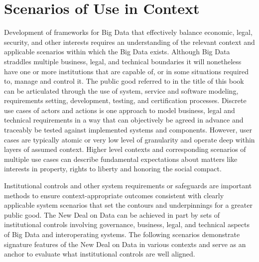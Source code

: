  \section{Scenarios of Use in Context }

Development of frameworks for Big Data that effectively balance economic, legal, security, and other interests requires an understanding of the relevant context and applicable scenarios within which the Big Data exists.
Although Big Data straddles multiple business, legal, and technical boundaries it will nonetheless have one or more institutions that are capable of, or in some situations required to, manage and control it.
The public good referred to in the title of this book can be articulated through the use of system, service and software modeling, requirements setting, development, testing, and certification processes.
Discrete use cases of actors and actions is one approach to model business, legal and technical requirements in a way that can objectively be agreed in advance and traceably be tested against implemented systems and components.
However, user cases are typically atomic or very low level of granularity and operate deep within layers of assumed context.
Higher level contexts and corresponding scenarios of multiple use cases can describe fundamental expectations about matters like interests in property, rights to liberty and honoring the social compact. 


 Institutional controls and other system requirements or safeguards are important methods to ensure context-appropriate outcomes consistent with clearly applicable system scenarios that set the contours and underpinnings for a greater public good.
 The New Deal on Data can be achieved in part by sets of institutional controls involving governance, business, legal, and technical aspects of Big Data and interoperating systems.  The following scenarios demonstrate signature features of the New Deal on Data in various contexts and serve as an anchor to evaluate what institutional controls are well aligned. 
 

